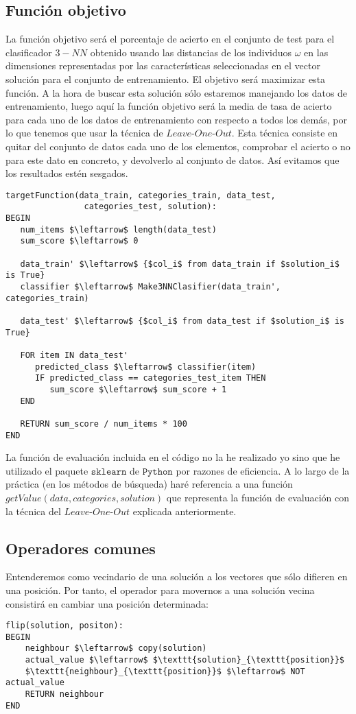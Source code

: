 \documentclass[11pt,leqno]{article}
\begin{document}
\subsection{Función objetivo}
	La función objetivo será el porcentaje de acierto en el conjunto de test para el clasificador $3-NN$ obtenido usando las distancias de los individuos $\omega$ en las dimensiones representadas por las características seleccionadas en el vector solución para el conjunto de entrenamiento. El objetivo será maximizar esta función. A la hora de buscar esta solución sólo estaremos manejando los datos de entrenamiento, luego aquí la función objetivo será la media de tasa de acierto para cada uno de los datos de entrenamiento con respecto a todos los demás, por lo que tenemos que usar la técnica de $\textit{Leave-One-Out}$. Esta técnica consiste en quitar del conjunto de datos cada uno de los elementos, comprobar el acierto o no para este dato en concreto, y devolverlo al conjunto de datos. Así evitamos que los resultados estén sesgados.
	
\begin{lstlisting}[mathescape=true]
targetFunction(data_train, categories_train, data_test,
				categories_test, solution):
BEGIN
   num_items $\leftarrow$ length(data_test)
   sum_score $\leftarrow$ 0
	
   data_train' $\leftarrow$ {$col_i$ from data_train if $solution_i$ is True}
   classifier $\leftarrow$ Make3NNClasifier(data_train', categories_train)

   data_test' $\leftarrow$ {$col_i$ from data_test if $solution_i$ is True}
	
   FOR item IN data_test'
      predicted_class $\leftarrow$ classifier(item)
      IF predicted_class == categories_test_item THEN
         sum_score $\leftarrow$ sum_score + 1
   END
	
   RETURN sum_score / num_items * 100 
END
\end{lstlisting}

	La función de evaluación incluida en el código no la he realizado yo sino que he utilizado el paquete $\texttt{sklearn}$ de $\texttt{Python}$ por razones de eficiencia. A lo largo de la práctica (en los métodos de búsqueda) haré referencia a una función $getValue(data, categories, solution)$ que representa la función de evaluación con la técnica del $\textit{Leave-One-Out}$ explicada anteriormente.
	
\subsection{Operadores comunes}
	Entenderemos como vecindario de una solución a los vectores que sólo difieren en una posición. Por tanto, el operador para movernos a una solución vecina consistirá en cambiar una posición determinada:
\begin{lstlisting}[mathescape=true]
flip(solution, positon):
BEGIN
	neighbour $\leftarrow$ copy(solution)
	actual_value $\leftarrow$ $\texttt{solution}_{\texttt{position}}$
	$\texttt{neighbour}_{\texttt{position}}$ $\leftarrow$ NOT actual_value
	RETURN neighbour
END
\end{lstlisting}
	
\end{document}
